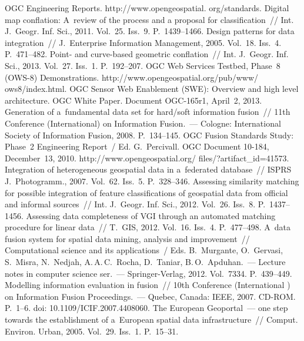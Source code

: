 \begin{multicols}{2}
{\small\frenchspacing
 {%
 \begin{thebibliography}{99}
OGC Engineering Reports. {\sf http://www.opengeospatial.
org/standards}.
 Digital map conflation: A~review of the process and a proposal for 
classification~// Int. J.~Geogr. Inf. Sci., 2011. Vol.~25. Iss.~9. P.~1439--1466.
 Design patterns for data integration~// J.~Enterprise Information 
Management, 2005. Vol.~18. Iss.~4. P.~471--482.
 Point- and  
curve-based geometric conflation~// Int. J.~Geogr. Inf. Sci., 2013. Vol.~27. Iss.~1. 
P.~192--207.
OGC Web Services Testbed, Phase~8 (OWS-8) Demonstrations. {\sf 
http://www.opengeospatial.org/pub/www/ ows8/index.html}.
OGC Sensor Web Enablement (SWE): Overview and high level 
architecture. OGC White Paper. Document OGC-165r1, April~2, 2013.
 Generation of a~fundamental data set for hard/soft information fusion~// 11th 
Conference (International) on Information Fusion.~--- Cologne: International Society of Information 
Fusion, 2008. P.~134--145.
OGC Fusion Standards Study: Phase~2 Engineering Report~/ Ed. G.~Percivall. 
OGC Document 
10-184, December~13, 2010. {\sf http://www.opengeospatial.org/ files/?artifact\_id=41573}.
 Integration of heterogeneous geospatial data in a~federated 
database~// ISPRS J.~Photogramm., 2007. Vol.~62. Iss.~5. P.~328--346. 
 Assessing similarity matching for possible integration of feature 
classifications of geospatial data from official and informal sources~// Int. J.~Geogr. 
Inf. Sci., 2012. Vol.~26. Iss.~8. P.~1437--1456.
 Assessing data completeness of VGI through an 
automated matching procedure for linear data~// T.~GIS, 2012. Vol.~16. Iss.~4. P.~477--498.
 A~data fusion system for spatial data mining, analysis and 
improvement~// Computational science and its applications~/
Eds. B.~Murgante, O.~Gervasi, S.~Misra, N.~Nedjah, A.\,A.\,C.~Rocha, D.~Taniar, 
B.\,O.~Apduhan.~--- Lecture notes in computer science ser.~---  Springer-Verlag, 2012. 
Vol.~7334. P.~439--449. 
 Modelling information evaluation in fusion~//  10th Conference (International ) on 
Information Fusion Proceedings.~--- Quebec, Canada: IEEE, 2007. CD-ROM. P.~1--6. doi: 
10.1109/ICIF.2007.4408060.
 The European Geoportal~--- one step 
towards the establishment of a~European spatial data infrastructure~// Comput. Environ. 
Urban, 2005. Vol.~29. Iss.~1. P.~15--31.
 \end{thebibliography}

}}
\end{multicols}
